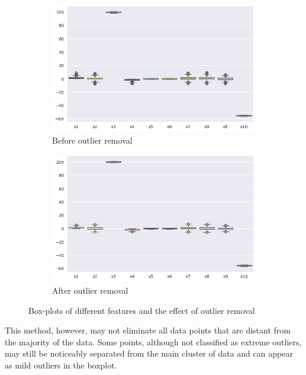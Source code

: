 \begin{figure}[h]
     \centering
     \begin{subfigure}[b]{0.45\textwidth}
         \centering
         \includegraphics[width=\textwidth]{images/outliers_before.png}
         \caption{Before outlier removal}
         \label{fig:outliers_before}
     \end{subfigure}
     \hfill
     \begin{subfigure}[b]{0.45\textwidth}
         \centering
         \includegraphics[width=\textwidth]{images/outliers_after.png}
         \caption{After outlier removal}
         \label{fig:outliers_after}
     \end{subfigure}
     
    \caption{Box-plots of different features and the effect of outlier removal}
    \label{fig:outlier_removal}
\end{figure}

This method, however, may not eliminate all data points that are distant from the majority of the data. Some points, although not classified as extreme outliers, may still be noticeably separated from the main cluster of data and can appear as mild outliers in the boxplot.
